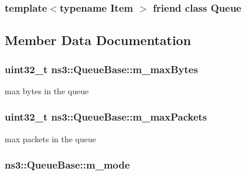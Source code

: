\subsubsection[{\texorpdfstring{Queue}{Queue}}]{\setlength{\rightskip}{0pt plus 5cm}template$<$typename Item $>$ friend class {\bf Queue}\hspace{0.3cm}{\ttfamily [friend]}}\hypertarget{classns3_1_1QueueBase_a76db68f71f6e65aa4083615ee111ab59}{}\label{classns3_1_1QueueBase_a76db68f71f6e65aa4083615ee111ab59}


\subsection{Member Data Documentation}
\subsubsection[{\texorpdfstring{m\+\_\+max\+Bytes}{m_maxBytes}}]{\setlength{\rightskip}{0pt plus 5cm}uint32\+\_\+t ns3\+::\+Queue\+Base\+::m\+\_\+max\+Bytes\hspace{0.3cm}{\ttfamily [private]}}\hypertarget{classns3_1_1QueueBase_a28904f9e2223a440dcb03db0c09fa8d2}{}\label{classns3_1_1QueueBase_a28904f9e2223a440dcb03db0c09fa8d2}


max bytes in the queue 

\subsubsection[{\texorpdfstring{m\+\_\+max\+Packets}{m_maxPackets}}]{\setlength{\rightskip}{0pt plus 5cm}uint32\+\_\+t ns3\+::\+Queue\+Base\+::m\+\_\+max\+Packets\hspace{0.3cm}{\ttfamily [private]}}\hypertarget{classns3_1_1QueueBase_afa827170d7f381fb001722394b50b1ff}{}\label{classns3_1_1QueueBase_afa827170d7f381fb001722394b50b1ff}


max packets in the queue 

\subsubsection[{\texorpdfstring{m\+\_\+mode}{m_mode}}]{ ns3\+::\+Queue\+Base\+::m\+\_\+mode\hspace{0.3cm}{\ttfamily [private]}}\hypertarget{classns3_1_1QueueBase_a055b3b49d99e9180159639c993be2d98}{}\label{classns3_1_1QueueBase_a055b3b49d99e9180159639c993be2d98}


